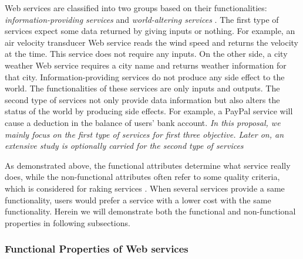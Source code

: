 Web services are classified into two groups based on their functionalities:  \emph{information-providing services} and \emph{world-altering services} \cite{mcilraith2001semantic}. The first type of services expect some data returned by giving inputs or nothing. For example, an air velocity transducer Web service reads the wind speed and returns the velocity at the time. This service does not require any inputs. On the other side, a city weather Web service requires a city name and returns weather information for that city. Information-providing services do not produce any side effect to the world. The functionalities of these services are only inputs and outputs. The second type of services not only provide data information but also alters the status of the world by producing side effects. For example, a PayPal service will cause a deduction in the balance of users' bank account. \emph{In this proposal, we mainly focus on the first type of services for first three objective. Later on, an extensive study is optionally carried for the second type of services}

As demonstrated above, the functional attributes determine what service really does, while the non-functional attributes often refer to some quality criteria, which is considered for raking services \cite{agarwal2009making}. When several services provide a same functionality, users would prefer a service with a lower cost with the same functionality. Herein we will demonstrate both the functional and non-functional properties in following subsections.



\subsubsection{Functional Properties of Web services}\label{functional}

